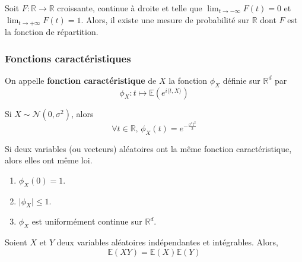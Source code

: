   \begin{theorem}
    Soit $F : \mathbb{R} \rightarrow \mathbb{R}$ croissante, continue à droite et telle que $\lim_{t \rightarrow -\infty} F(t) = 0$ et $\lim_{t \rightarrow +\infty} F(t) = 1$. Alors, il existe une mesure de probabilité sur $\mathbb{R}$ dont $F$ est la fonction de répartition.
  \end{theorem}

  \subsubsection{Fonctions caractéristiques}


  \begin{definition}
    On appelle \textbf{fonction caractéristique} de $X$ la fonction $\phi_X$ définie sur $\mathbb{R}^d$ par
    \[ \phi_X : t \mapsto \mathbb{E}\left( e^{i \langle t, X \rangle} \right) \]
  \end{definition}


  \begin{example}
    Si $X \sim \mathcal{N}(0, \sigma^2)$, alors
    \[ \forall t \in \mathbb{R}, \, \phi_X(t) = e^{-\frac{\sigma^2 t^2}{2}} \]
  \end{example}


  \begin{theorem}
    Si deux variables (ou vecteurs) aléatoires ont la même fonction caractéristique, alors elles ont même loi.
  \end{theorem}

  \begin{theorem}
    \begin{enumerate}[label={\bfseries(\roman*)}]
      \item $\phi_X(0) = 1$.
      \item $\vert \phi_X \vert \leq 1$.
      \item $\phi_X$ est uniformément continue sur $\mathbb{R}^d$.
    \end{enumerate}
  \end{theorem}

  \begin{theorem}
    Soient $X$ et $Y$ deux variables aléatoires indépendantes et intégrables. Alors,
    \[ \mathbb{E}(X Y) = \mathbb{E}(X) \mathbb{E}(Y) \]
  \end{theorem}

